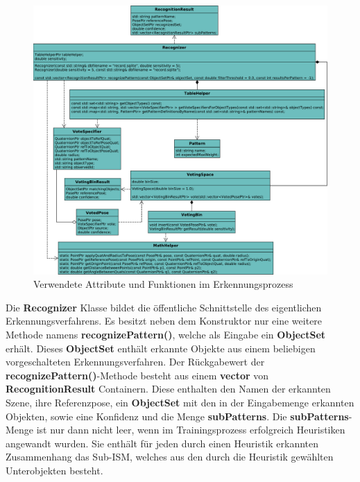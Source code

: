 \begin{figure}
  \centering
  \includegraphics[width=1.0\textwidth]{uml/recognizer.pdf}
  \caption{Verwendete Attribute und Funktionen im Erkennungsprozess}
  \label{fig:recognizer}
\end{figure}

Die \textbf{Recognizer} Klasse bildet die öffentliche Schnittstelle des eigentlichen Erkennungsverfahrens.
Es besitzt neben dem Konstruktor nur eine weitere Methode namens \textbf{recognizePattern()}, welche als Eingabe ein \textbf{ObjectSet} erhält.
Dieses \textbf{ObjectSet} enthält erkannte Objekte aus einem beliebigen vorgeschalteten Erkennungsverfahren.
Der Rückgabewert der \textbf{recognizePattern()}-Methode besteht aus einem \textbf{vector} von \textbf{RecognitionResult} Containern.
Diese enthalten den Namen der erkannten Szene, ihre Referenzpose, ein \textbf{ObjectSet} mit den in der Eingabemenge erkannten Objekten, sowie eine Konfidenz und die Menge \textbf{subPatterns}.
Die \textbf{subPatterns}-Menge ist nur dann nicht leer, wenn im Trainingsprozess erfolgreich Heuristiken angewandt wurden.
Sie enthält für jeden durch einen Heuristik erkannten Zusammenhang das Sub-ISM, welches aus den durch die Heuristik gewählten Unterobjekten besteht.

